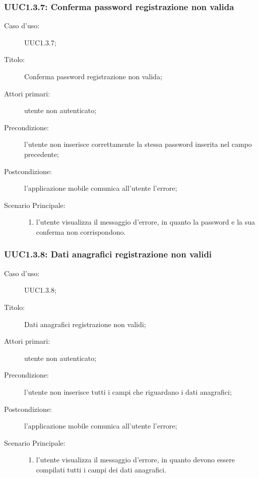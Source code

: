 \documentclass[../../../analisi-dei-requisiti.tex]{subfiles}
\begin{document}
\subsubsection{UUC1.3.7: Conferma password registrazione non valida}%
\label{subs:UUC1.3.7}
\begin{description}
  \item[Caso d’uso:] UUC1.3.7;
  \item[Titolo:] Conferma password registrazione non valida;
  \item[Attori primari:] utente non autenticato;
  \item[Precondizione:] l'utente non inserisce correttamente la stessa password inserita nel campo precedente;
  \item[Postcondizione:] l'applicazione mobile comunica all'utente l'errore;
  \item[Scenario Principale:]
        \begin{enumerate}
          \item l'utente visualizza il messaggio d'errore, in quanto la password e la sua conferma non corrispondono.
        \end{enumerate}
\end{description}

\subsubsection{UUC1.3.8: Dati anagrafici registrazione non validi}%
\label{subs:UUC1.3.8}
\begin{description}
  \item[Caso d’uso:] UUC1.3.8;
  \item[Titolo:] Dati anagrafici registrazione non validi;
  \item[Attori primari:] utente non autenticato;
  \item[Precondizione:] l'utente non inserisce tutti i campi che riguardano i dati anagrafici;
  \item[Postcondizione:] l'applicazione mobile comunica all'utente l'errore;
  \item[Scenario Principale:]
        \begin{enumerate}
          \item l'utente visualizza il messaggio d'errore, in quanto devono essere compilati tutti i campi dei dati anagrafici.
        \end{enumerate}
\end{description}
\end{document}
